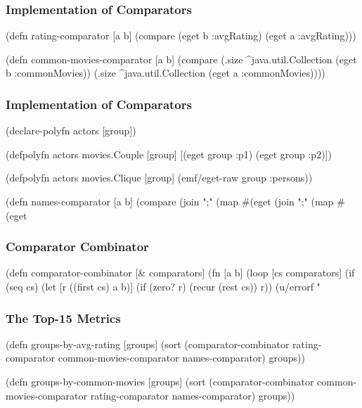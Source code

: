 \documentclass{beamer}
\begin{document}
\begin{frame}[fragile]
  \frametitle{Implementation of Comparators}
  \begin{clojurecode}
(defn rating-comparator [a b]
  (compare (eget b :avgRating)
           (eget a :avgRating)))

(defn common-movies-comparator [a b]
  (compare (.size ^java.util.Collection (eget b :commonMovies))
           (.size ^java.util.Collection (eget a :commonMovies))))
  \end{clojurecode}
\end{frame}

\begin{frame}[fragile]
  \frametitle{Implementation of Comparators}
  \begin{clojurecode}
(declare-polyfn actors [group])

(defpolyfn actors movies.Couple [group]
  [(eget group :p1) (eget group :p2)])

(defpolyfn actors movies.Clique [group]
  (emf/eget-raw group :persons))

(defn names-comparator [a b]
  (compare (join ";" (map #(eget %
           (join ";" (map #(eget %
  \end{clojurecode}
\end{frame}

\begin{frame}[fragile]
  \frametitle{Comparator Combinator}
  \begin{clojurecode}
(defn comparator-combinator [& comparators]
  (fn [a b]
    (loop [cs comparators]
      (if (seq cs)
        (let [r ((first cs) a b)]
          (if (zero? r)
            (recur (rest cs))
            r))
        (u/errorf "%
  \end{clojurecode}
\end{frame}

\begin{frame}[fragile]
  \frametitle{The Top-15 Metrics}
  \begin{clojurecode}
(defn groups-by-avg-rating [groups]
  (sort (comparator-combinator rating-comparator common-movies-comparator
                               names-comparator)
        groups))

(defn groups-by-common-movies [groups]
  (sort (comparator-combinator common-movies-comparator rating-comparator
                               names-comparator)
        groups))
  \end{clojurecode}
\end{frame}
\end{document}
